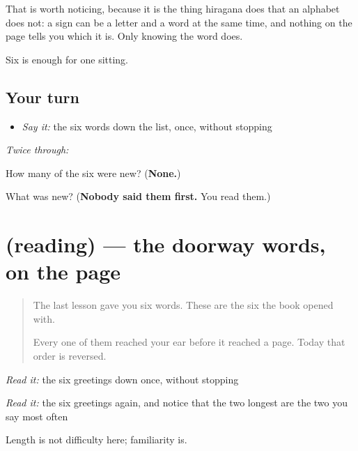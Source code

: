 That is worth noticing, because it is the thing hiragana does that an alphabet does not: a sign can be a letter and a word at the same time, and nothing on the page tells you which it is. Only knowing the word does.

Six is enough for one sitting.

\subsection*{Your turn}
\begin{itemize}
\raggedright
  \item \emph{Say it:} the six words down the list, once, without stopping
\end{itemize}

\emph{Twice through:}

\begin{tcolorbox}[breakable,colback=teal!4,colframe=teal!35!black,title={Before you move on}]
How many of the six were new? (\textbf{None.})

What was new? (\textbf{Nobody said them first.} You read them.)
\end{tcolorbox}
\section[(reading)]{(reading) — the doorway words, on the page}

\label{lesson:JA-C19-greetings}



\begin{quote}
The last lesson gave you six words. These are the six the book opened with.

Every one of them reached your ear before it reached a page. Today that order is reversed.
\end{quote}

\begin{tcolorbox}[breakable,skin=enhanced,colback=orange!6,colframe=orange!45!black,boxrule=0.5pt,arc=1mm,left=6pt,right=6pt,top=4pt,bottom=4pt,fonttitle=\bfseries,title={Read this}]
\begin{quote}
     
\end{quote}

\emph{Read it:} the six greetings down once, without stopping

\emph{Read it:} the six greetings again, and notice that the two longest are the two you say most often

Length is not difficulty here; familiarity is.
\end{tcolorbox}

